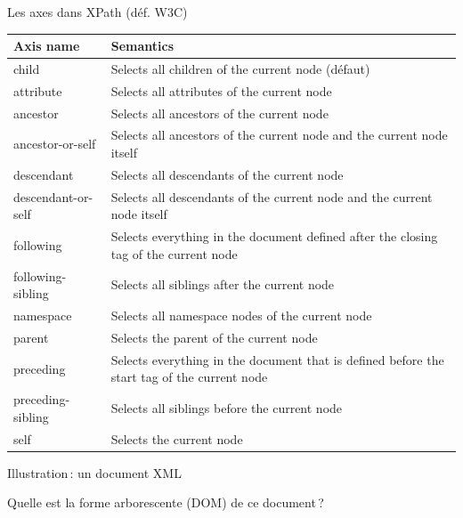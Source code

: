 \begin{frame}{Les axes dans XPath (déf. W3C)}

\begin{tabular}{| l | p{8cm} |}
\hline
Axis name & Semantics \\
\hline
\hline
child & Selects all children of the current node (défaut)\\
\hline
attribute & Selects all attributes of the current node \\
\hline
ancestor & Selects all ancestors of the current node \\
\hline
ancestor-or-self & Selects all ancestors of the current node and the current node itself \\
\hline
descendant & Selects all descendants  of the current node \\
\hline
descendant-or-self & Selects all descendants of the current node and the current node itself \\
\hline
following & Selects everything in the document defined after the closing tag of the current node \\
\hline
following-sibling & Selects all siblings after the current node \\
\hline
namespace & Selects all namespace nodes of the current node \\
\hline
parent & Selects the parent of the current node \\
\hline
preceding & Selects everything in the document that is defined before the start tag of the current node \\
\hline
preceding-sibling & Selects all siblings before the current node \\
\hline
self & Selects the current node \\
\hline
\end{tabular}

\end{frame}



\begin{frame}{Illustration\,: un document XML}




\begin{exoblock}
Quelle est la forme arborescente (DOM) de ce document\,?
\end{exoblock}

\end{frame}


